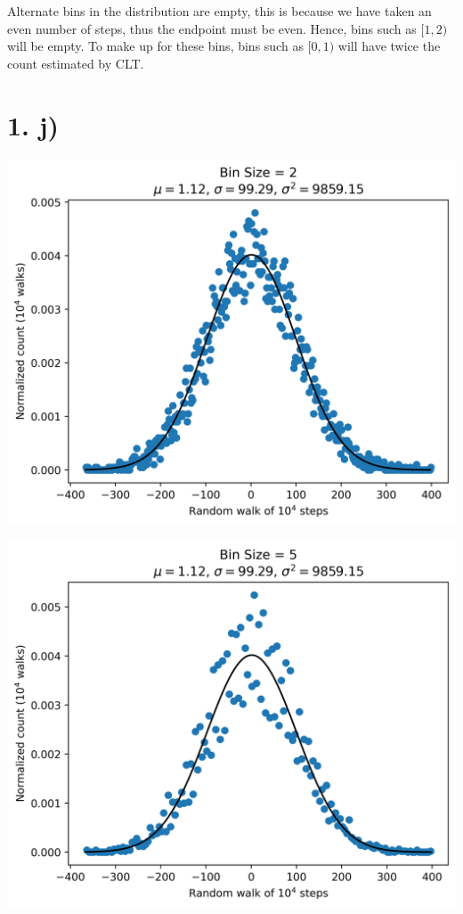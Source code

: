 \documentclass{article}
\begin{document}
Alternate bins in the distribution are empty, this is because we have taken an even number of steps, thus the endpoint must be even.
Hence, bins such as $[1, 2)$ will be empty. To make up for these bins, bins such as $[0, 1)$ will have twice the count estimated by CLT.

\section*{1. j)}

\begin{center}
    \includegraphics[scale=0.8]{1ij_dx_2.png}

    \includegraphics[scale=0.8]{1ij_dx_5.png}


\end{center}
\end{document}
